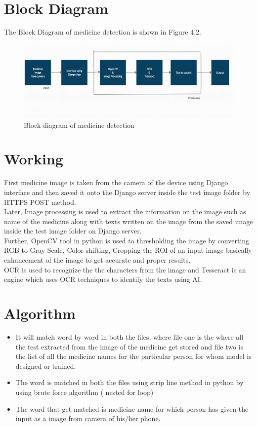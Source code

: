 \section{Block Diagram}
\noindent The Block Diagram of medicine detection is shown in Figure 4.2.
\begin{figure}[h!]
    \centering
    \includegraphics[width=1\textwidth]{CHAPTERS/c32.PNG}
    \caption{Block diagram of medicine detection}
\end{figure}
\section{Working}
First medicine image is taken from the camera of the device using Django interface and then saved it onto the Django server inside the test image folder by HTTPS POST method.\\Later, Image processing is used to extract the information on the image such as name of the medicine along with texts written on the image from the saved image inside the test image folder on Django server.\\Further, OpenCV tool in python is used to thresholding the image by converting RGB to Gray Scale, Color shifting, Cropping the ROI of an input image basically enhancement of the image to get accurate and proper results.\\OCR is used to recognize the the characters from the image and Tesseract is an engine which uses OCR techniques to identify the texts using AI.\citeauthor{9020104}
\newpage
\section{Algorithm}
\begin{itemize}
	\item It will match word by word in both the files, where file one is the where all the test extracted from the image of the medicine get stored and file two is the list of all the medicine names for the particular person for whom model is designed or trained.
	\item The word is matched in both the files using strip line method in python by using brute force algorithm ( nested for loop)
	\item The word that get matched is medicine name for which person has given the input as a image from camera of his/her phone. \citeauthor{9020103}
\end{itemize}
